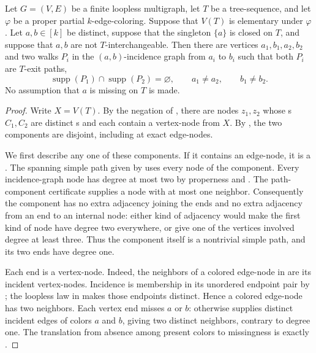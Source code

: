 \begin{helper}
Let $G=(V,E)$ be a finite loopless multigraph, let $T$ be a
tree-sequence, and let $\varphi$ be a proper partial $k$-edge-coloring.
Suppose that $V(T)$ is elementary under $\varphi$.  Let $a,b\in[k]$ be
distinct, suppose that the singleton $\{a\}$ is closed on $T$, and
suppose that $a,b$ are not $T$-interchangeable.  Then there are vertices
$a_1,b_1,a_2,b_2$ and two walks $P_i$ in the $(a,b)$-incidence graph
from $a_i$ to $b_i$ such that both $P_i$ are $T$-exit paths,
\[
  \operatorname{supp}(P_1)\cap\operatorname{supp}(P_2)=\varnothing,
  \qquad a_1\ne a_2,\qquad b_1\ne b_2.
\]
No assumption that $a$ is missing on $T$ is made.
\end{helper}
\begin{proof}
Write $X=V(T)$.  By the negation of , there
are nodes $z_1,z_2$ whose s $C_1,C_2$ are
distinct s and each contain a vertex-node
from $X$.  By , the two components
are disjoint, including at exact edge-nodes.

We first describe any one of these components.  If it contains an
edge-node, it is a .  The
spanning simple path given by 
uses every node of the component.  Every incidence-graph node has degree
at most two by properness and
.  The path-component
certificate supplies a node with at most one neighbor.  Consequently the
component has no extra adjacency joining the ends and no extra adjacency
from an end to an internal node: either kind of adjacency would make the
first kind of node have degree two everywhere, or give one of the
vertices involved degree at least three.  Thus the component itself is a
nontrivial simple path, and its two ends have degree one.

Each end is a vertex-node.  Indeed, the neighbors of a colored edge-node
in  are its incident vertex-nodes.
Incidence is membership in its unordered endpoint pair by
; the loopless law in 
makes those endpoints distinct.  Hence a colored edge-node has two
neighbors.  Each vertex end misses $a$ or $b$: otherwise
 supplies distinct incident edges of colors $a$
and $b$, giving two distinct neighbors, contrary to degree one.  The
translation from absence among present colors to missingness is exactly
.


\end{proof}
